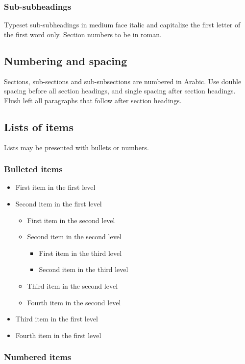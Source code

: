 \documentclass{ws-ijnt}
\begin{document}
\subsubsection{Sub-subheadings}
Typeset sub-subheadings in medium face italic and capitalize the first
letter of the first word only. Section numbers to be in roman.

\subsection{Numbering and spacing}
Sections, sub-sections and sub-subsections are numbered in Arabic.
Use double spacing before all section headings, and single spacing
after section headings. Flush left all paragraphs that follow after
section headings.

\subsection{Lists of items}
Lists may be presented with bullets or numbers.

\subsubsection{Bulleted items}

\begin{itemize}
\item First item in the first level
\item Second item in the first level
\begin{itemize}
\item First item in the second level 
\item Second item in the second level
\begin{itemize}
\item First item in the third level 
\item Second item in the third level
\end{itemize}
\item Third item in the second level
\item Fourth item in the second level
\end{itemize}
\item Third item in the first level
\item Fourth item in the first level
\end{itemize}

\subsubsection{Numbered items}
\end{document}
